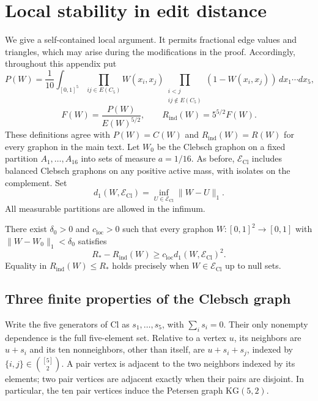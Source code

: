 \appendix
\section{Local stability in edit distance}\label{app:local-stability}

We give a self-contained local argument. It permits fractional edge
values and triangles, which may arise during the modifications in the
proof. Accordingly, throughout this appendix put
\[
 P(W)=\frac1{10}\int_{[0,1]^5}
       \prod_{ij\in E(C_5)}W(x_i,x_j)
       \prod_{\substack{i<j\\ij\notin E(C_5)}}(1-W(x_i,x_j))
       \,dx_1\cdots dx_5,
\]
\[
 F(W)=\frac{P(W)}{E(W)^{5/2}},\qquad
 R_{\mathrm{ind}}(W)=5^{5/2}F(W).
\]
These definitions agree with $P(W)=C(W)$ and $R_{\mathrm{ind}}(W)=R(W)$
for every graphon in the main text. Let $W_0$ be the Clebsch graphon on
a fixed partition $A_1,\ldots,A_{16}$ into sets of measure $a=1/16$.
As before, $\mathcal E_{\mathrm{Cl}}$ includes balanced Clebsch graphons
on any positive active mass, with isolates on the complement. Set
\[
 d_1(W,\mathcal E_{\mathrm{Cl}})
   =\inf_{U\in\mathcal E_{\mathrm{Cl}}}\lVert W-U\rVert_1.
\]
All measurable partitions are allowed in the infimum.

\begin{theorem}\label{thm:local-stability}
There exist $\delta_0>0$ and $c_{\mathrm{loc}}>0$ such that every graphon
$W:[0,1]^2\to[0,1]$ with $\lVert W-W_0\rVert_1<\delta_0$ satisfies
\begin{equation}\tag{76}\label{eq:local-stability}
 R_\ast-R_{\mathrm{ind}}(W)
   \geq c_{\mathrm{loc}}d_1(W,\mathcal E_{\mathrm{Cl}})^2.
\end{equation}
Equality in $R_{\mathrm{ind}}(W)\leq R_\ast$ holds precisely when
$W\in\mathcal E_{\mathrm{Cl}}$ up to null sets.
\end{theorem}

\subsection{Three finite properties of the Clebsch graph}

Write the five generators of $\mathrm{Cl}$ as $s_1,\ldots,s_5$, with
$\sum_i s_i=0$. Their only nonempty dependence is the full five-element
set. Relative to a vertex $u$, its neighbors are $u+s_i$ and its ten
nonneighbors, other than itself, are $u+s_i+s_j$, indexed by
$\{i,j\}\in\binom{[5]}{2}$. A pair vertex is adjacent to the two
neighbors indexed by its elements; two pair vertices are adjacent
exactly when their pairs are disjoint. In particular, the ten pair
vertices induce the Petersen graph $\mathrm{KG}(5,2)$.

